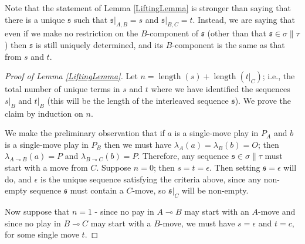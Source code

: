 \documentclass[11pt]{article} %
\theoremstyle{plain} %
\theoremstyle{definition} %
\theoremstyle{exercisestyle}
\renewcommand{\implies}{\multimap}
\newcommand{\s}{\mathfrak s}
\newcommand{\emptyplay}{\epsilon}
\DeclareMathOperator{\length}{length}
\begin{document}
Note that the statement of Lemma \ref{LiftingLemma} is stronger than saying that there is a unique $\s$ such that $\s\vert_{A,B}=s$ and $\s\vert_{B,C}=t$.  Instead, we are saying that even if we make no restriction on the $B$-component of $\s$ (other than that $\s\in\sigma\|\tau$) then $\s$ is still uniquely determined, and its $B$-component is the same as that from $s$ and $t$.  

\begin{proof}[Proof of Lemma \ref{LiftingLemma}]
  Let $n=\length(s)+\length(t\vert_C)$; i.e., the total number of unique terms in $s$ and $t$ where we have identified the sequences $s\vert_B$ and $t\vert_B$ (this will be the length of the interleaved sequence $\s$).  We prove the claim by induction on $n$.  

  We make the preliminary observation that if $a$ is a single-move play in $P_A$ and $b$ is a single-move play in $P_B$ then we must have $\lambda_A(a)=\lambda_B(b)=O$; then $\lambda_{A\implies B}(a)=P$ and $\lambda_{B\implies C}(b)=P$.  Therefore, any sequence $\s\in\sigma\|\tau$ must start with a move from $C$.  Suppose $n=0$; then $s=t=\emptyplay$.  Then setting $\s=\emptyplay$ will do, and $\emptyplay$ is the unique sequence satisfying the criteria above, since any non-empty sequence $\s$ must contain a $C$-move, so $\s\vert_C$ will be non-empty.

  Now suppose that $n=1$ - since no pay in $A\implies B$ may start with an $A$-move and since no play in $B\implies C$ may start with a $B$-move, we must have $s=\emptyplay$ and $t=c$, for some single move $t$.  
\end{proof}
\end{document}
